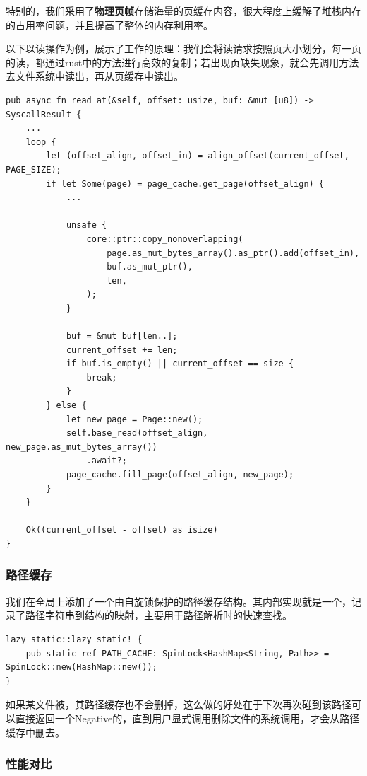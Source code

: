 \documentclass{article}
\begin{document}
特别的，我们采用了\textbf{物理页帧}存储海量的页缓存内容，很大程度上缓解了堆栈内存的占用率问题，并且提高了整体的内存利用率。

以下以读操作为例，展示了工作的原理：我们会将读请求按照页大小划分，每一页的读，都通过rust中的方法进行高效的复制；若出现页缺失现象，就会先调用方法去文件系统中读出，再从页缓存中读出。

\begin{lstlisting}
pub async fn read_at(&self, offset: usize, buf: &mut [u8]) -> SyscallResult {
    ...
    loop {
        let (offset_align, offset_in) = align_offset(current_offset, PAGE_SIZE);
        if let Some(page) = page_cache.get_page(offset_align) {
            ...

            unsafe {
                core::ptr::copy_nonoverlapping(
                    page.as_mut_bytes_array().as_ptr().add(offset_in),
                    buf.as_mut_ptr(),
                    len,
                );
            }

            buf = &mut buf[len..];
            current_offset += len;
            if buf.is_empty() || current_offset == size {
                break;
            }
        } else {
            let new_page = Page::new();
            self.base_read(offset_align, new_page.as_mut_bytes_array())
                .await?;
            page_cache.fill_page(offset_align, new_page);
        }
    }

    Ok((current_offset - offset) as isize)
}
\end{lstlisting}

\subsubsection{路径缓存}
我们在全局上添加了一个由自旋锁保护的路径缓存结构。其内部实现就是一个，记录了路径字符串到结构的映射，主要用于路径解析时的快速查找。

\begin{lstlisting}
lazy_static::lazy_static! {
    pub static ref PATH_CACHE: SpinLock<HashMap<String, Path>> = SpinLock::new(HashMap::new());
}
\end{lstlisting}

如果某文件被，其路径缓存也不会删掉，这么做的好处在于下次再次碰到该路径可以直接返回一个Negative的，直到用户显式调用删除文件的系统调用，才会从路径缓存中删去。

\subsubsection{性能对比}
\end{document}
